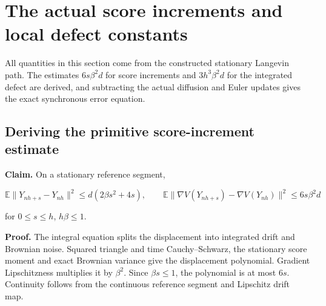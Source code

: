 \documentclass[11pt,a4paper]{report}
\begin{document}
\section{\texorpdfstring{The actual score increments and local defect constants}{The actual score increments and local defect constants}}
\label{proof-module-WassersteinMixing-ActualLocalError-lean}


All quantities in this section come from the constructed stationary Langevin path. The estimates \(6s\beta^2d\) for score increments and \(3h^3\beta^2d\) for the integrated defect are derived, and subtracting the actual diffusion and Euler updates gives the exact synchronous error equation.

\subsection{\texorpdfstring{Deriving the primitive score-increment estimate}{Deriving the primitive score-increment estimate}}
\label{report-step-WassersteinMixing-ActualLocalError-lean-1}


\textbf{Claim.} On a stationary reference segment,

\[\mathbb E\|Y_{nh+s}-Y_{nh}\|^2\le d(2\beta s^2+4s),\qquad \mathbb E\|\nabla V(Y_{nh+s})-\nabla V(Y_{nh})\|^2\le6s\beta^2d\]

for \(0\le s\le h\), \(h\beta\le1\).



\textbf{Proof.} The integral equation splits the displacement into integrated drift and Brownian noise. Squared triangle and time Cauchy–Schwarz, the stationary score moment and exact Brownian variance give the displacement polynomial. Gradient Lipschitzness multiplies it by \(\beta^2\). Since \(\beta s\le1\), the polynomial is at most \(6s\). Continuity follows from the continuous reference segment and Lipschitz drift map.
\end{document}
